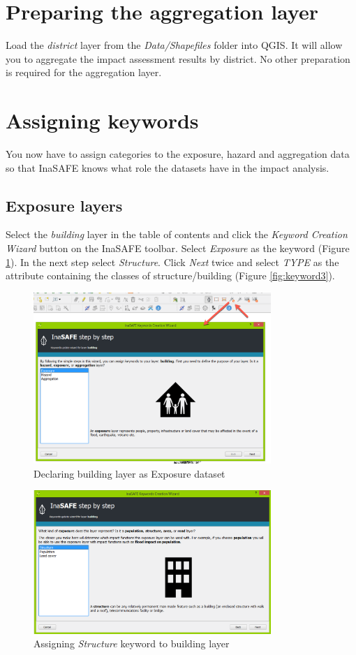 \documentclass[a4paper,12pt,titlepage]{article}
\begin{document}
\section{Preparing the aggregation layer}

Load the \textit{district} layer from the \textit{Data/Shapefiles} folder into QGIS. It will allow you to aggregate the impact assessment results by district. No other preparation is required for the aggregation layer.

\section{Assigning keywords}

You now have to assign categories to the exposure, hazard and aggregation data so that InaSAFE knows what role the datasets have in the impact analysis. 

\subsection{Exposure layers}

Select the \textit{building} layer in the table of contents and click the \textit{Keyword Creation Wizard} button on the InaSAFE toolbar. Select \textit{Exposure} as the keyword (Figure \ref{fig:keyword1}). In the next step select \textit{Structure}. Click \textit{Next} twice and select \textit{TYPE} as the attribute containing the classes of structure/building (Figure \ref{fig:keyword3}).

\begin{figure}[htb]
	\centering
	\includegraphics[width=9cm]{Images/keyword1.png}
	\caption{Declaring building layer as Exposure dataset}\label{fig:keyword1}
\end{figure}

\begin{figure}[htb]
	\centering
	\includegraphics[width=9cm]{Images/keyword2.png}
	\caption{Assigning \textit{Structure} keyword to building layer}\label{fig:keyword2}
\end{figure}
\end{document}
